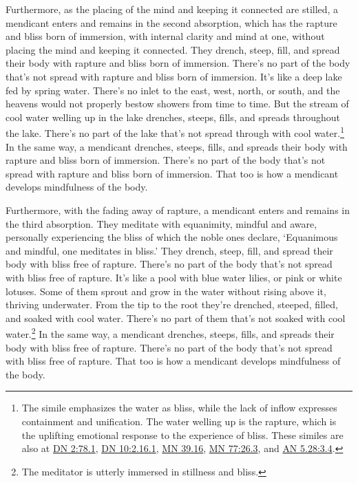 \documentclass[12pt,openany]{book}%
\begin{document}
Furthermore, as the placing of the mind and keeping it connected are stilled, a mendicant enters and remains in the second absorption, which has the rapture and bliss born of immersion, with internal clarity and mind at one, without placing the mind and keeping it connected. They drench, steep, fill, and spread their body with rapture and bliss born of immersion. There’s no part of the body that’s not spread with rapture and bliss born of immersion. It’s like a deep lake fed by spring water. There’s no inlet to the east, west, north, or south, and the heavens would not properly bestow showers from time to time. But the stream of cool water welling up in the lake drenches, steeps, fills, and spreads throughout the lake. There’s no part of the lake that’s not spread through with cool water.\footnote{The simile emphasizes the water as bliss, while the lack of inflow expresses containment and unification. The water welling up is the rapture, which is the uplifting emotional response to the experience of bliss. These similes are also at \href{https://suttacentral.net/dn2/en/sujato\#78.1}{DN 2:78.1}, \href{https://suttacentral.net/dn10/en/sujato\#2.16.1}{DN 10:2.16.1}, \href{https://suttacentral.net/mn39.16/en/sujato}{MN 39.16}, \href{https://suttacentral.net/mn77/en/sujato\#26.3}{MN 77:26.3}, and \href{https://suttacentral.net/an5.28/en/sujato\#3.4}{AN 5.28:3.4}. } In the same way, a mendicant drenches, steeps, fills, and spreads their body with rapture and bliss born of immersion. There’s no part of the body that’s not spread with rapture and bliss born of immersion. That too is how a mendicant develops mindfulness of the body. 

Furthermore, with the fading away of rapture, a mendicant enters and remains in the third absorption. They meditate with equanimity, mindful and aware, personally experiencing the bliss of which the noble ones declare, ‘Equanimous and mindful, one meditates in bliss.’ They drench, steep, fill, and spread their body with bliss free of rapture. There’s no part of the body that’s not spread with bliss free of rapture. It’s like a pool with blue water lilies, or pink or white lotuses. Some of them sprout and grow in the water without rising above it, thriving underwater. From the tip to the root they’re drenched, steeped, filled, and soaked with cool water. There’s no part of them that’s not soaked with cool water.\footnote{The meditator is utterly immersed in stillness and bliss. } In the same way, a mendicant drenches, steeps, fills, and spreads their body with bliss free of rapture. There’s no part of the body that’s not spread with bliss free of rapture. That too is how a mendicant develops mindfulness of the body. 
\end{document}
